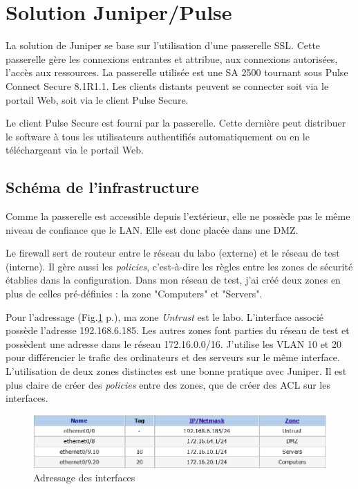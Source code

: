 \section{Solution Juniper/Pulse}
La solution de Juniper se base sur l'utilisation d'une passerelle SSL.
Cette passerelle gère les connexions entrantes et attribue, aux connexions autorisées, l'accès aux ressources.
La passerelle utilisée est une SA 2500 tournant sous Pulse Connect Secure 8.1R1.1.
Les clients distants peuvent se connecter soit via le portail Web, soit via le client Pulse Secure.

Le client Pulse Secure est fourni par la passerelle.
Cette dernière peut distribuer le software à tous les utilisateurs authentifiés automatiquement ou en le téléchargeant via le portail Web.

\subsection{Schéma de l'infrastructure}
Comme la passerelle est accessible depuis l'extérieur, elle ne possède pas le même niveau de confiance que le LAN.
Elle est donc placée dans une DMZ.

Le firewall sert de routeur entre le réseau du labo (externe) et le réseau de test (interne).
Il gère aussi les \textit{policies}, c'est-à-dire les règles entre les zones de sécurité établies dans la configuration.
Dans mon réseau de test, j'ai créé deux zones en plus de celles pré-définies : la zone "Computers" et "Servers".

Pour l'adressage (Fig.\ref{fig:ifJuniper} p.\pageref{fig:ifJuniper}), ma zone \textit{Untrust} est le labo. 
L'interface associé possède l'adresse 192.168.6.185.
Les autres zones font parties du réseau de test et possèdent une adresse dans le réseau 172.16.0.0/16.
J'utilise les VLAN 10 et 20 pour différencier le trafic des ordinateurs et des serveurs sur le même interface.
L'utilisation de deux zones distinctes est une bonne pratique avec Juniper. 
Il est plus claire de créer des \textit{policies} entre des zones, que de créer des ACL sur les interfaces.
\begin{figure}[ht]
	\centering
	\includegraphics[width=16cm]{juniper/interfaces.png}
	\caption{Adressage des interfaces}
	\label{fig:ifJuniper}
\end{figure}

